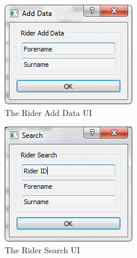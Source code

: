 \begin{figure}
\includegraphics[width=\textwidth]{./Maintenance/UI/RiderAD.png}
\caption{The Rider Add Data UI} \label{fig:RiderAD_UI}
\end{figure}

\begin{figure}
\includegraphics[width=\textwidth]{./Maintenance/UI/RiderSearch.png}
\caption{The Rider Search UI} \label{fig:RdierSearch_UI}
\end{figure}

